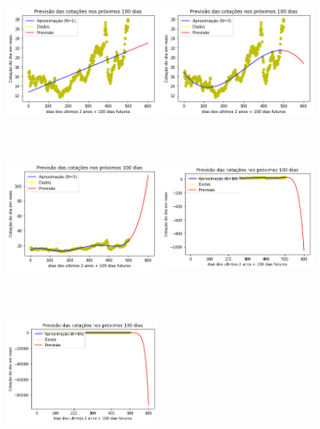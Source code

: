 \documentclass{article}
\begin{document}
\begin{figure}[!htb]
\includegraphics [width=5cm,height=5cm]{PrevisaoLU/P1.png}
\includegraphics [width=5cm,height=5cm]{PrevisaoLU/P3.png}
\includegraphics [width=5cm,height=5cm]{PrevisaoLU/P5.png}
\includegraphics [width=5cm,height=5cm]{PrevisaoLU/P10.png}
\includegraphics [width=5cm,height=5cm]{PrevisaoLU/P15.png}

\end{figure}
\end{document}
